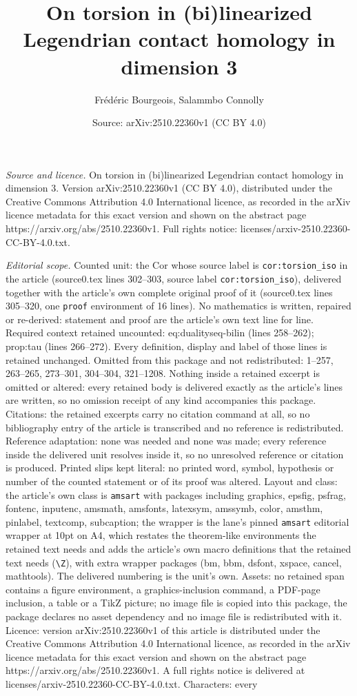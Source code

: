 \documentclass[10pt,a4paper]{amsart}
\title[On torsion in (bi)linearized Legendrian contact homology in ]{On torsion in (bi)linearized Legendrian contact homology in dimension 3}
\author{Fr\'ed\'eric Bourgeois, Salammbo Connolly}
\date{Source: arXiv:2510.22360v1 (CC BY 4.0)}
\begin{document}
\maketitle

\noindent\emph{Source and licence.} On torsion in (bi)linearized Legendrian contact homology in dimension 3. Version arXiv:2510.22360v1 (CC BY 4.0), distributed under the Creative Commons Attribution 4.0 International licence, as recorded in the arXiv licence metadata for this exact version and shown on the abstract page https://arxiv.org/abs/2510.22360v1. Full rights notice: licenses/arxiv-2510.22360-CC-BY-4.0.txt.\par\smallskip

\noindent\textit{Editorial scope.} Counted unit: the Cor whose source label is \texttt{cor:torsion\_iso} in the article (source0.tex lines 302--303, source label \texttt{cor:torsion\_iso}), delivered together with the article's own complete original proof of it (source0.tex lines 305--320, one \texttt{proof} environment of 16 lines). No mathematics is written, repaired or re-derived: statement and proof are the article's own text line for line. Required context retained uncounted: eq:dualityseq-bilin (lines 258--262); prop:tau (lines 266--272). Every definition, display and label of those lines is retained unchanged. Omitted from this package and not redistributed: 1--257, 263--265, 273--301, 304--304, 321--1208. Nothing inside a retained excerpt is omitted or altered: every retained body is delivered exactly as the article's lines are written, so no omission receipt of any kind accompanies this package. Citations: the retained excerpts carry no citation command at all, so no bibliography entry of the article is transcribed and no reference is redistributed. Reference adaptation: none was needed and none was made; every reference inside the delivered unit resolves inside it, so no unresolved reference or citation is produced. Printed slips kept literal: no printed word, symbol, hypothesis or number of the counted statement or of its proof was altered. Layout and class: the article's own class is \texttt{amsart} with packages including graphics, epsfig, psfrag, fontenc, inputenc, amsmath, amsfonts, latexsym, amssymb, color, amsthm, pinlabel, textcomp, subcaption; the wrapper is the lane's pinned \texttt{amsart} editorial wrapper at 10pt on A4, which restates the theorem-like environments the retained text needs and adds the article's own macro definitions that the retained text needs (\texttt{\textbackslash Z}), with extra wrapper packages (bm, bbm, dsfont, xspace, cancel, mathtools). The delivered numbering is the unit's own. Assets: no retained span contains a figure environment, a graphics-inclusion command, a PDF-page inclusion, a table or a TikZ picture; no image file is copied into this package, the package declares no asset dependency and no image file is redistributed with it. Licence: version arXiv:2510.22360v1 of this article is distributed under the Creative Commons Attribution 4.0 International licence, as recorded in the arXiv licence metadata for this exact version and shown on the abstract page https://arxiv.org/abs/2510.22360v1. A full rights notice is delivered at licenses/arxiv-2510.22360-CC-BY-4.0.txt. Characters: every 
\end{document}

